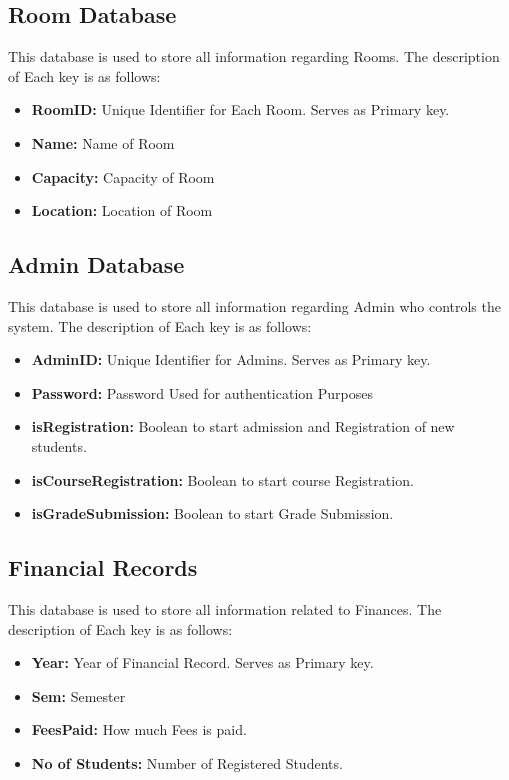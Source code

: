 \documentclass[12pt,a4paper]{article}
\begin{document}
     \subsection{Room Database}
        This database is used to store all information regarding Rooms. The description of Each key is as follows:
        \begin{itemize}
       \item \textbf{RoomID:} Unique Identifier for Each Room. Serves as Primary key.
        \item  \textbf{Name:} Name of Room
        \item  \textbf{Capacity:} Capacity of Room
        \item  \textbf{Location:} Location of Room
    \end{itemize}
    \subsection{Admin Database}
        This database is used to store all information regarding Admin who controls the system. The description of Each key is as follows:
        \begin{itemize}
       \item \textbf{AdminID:} Unique Identifier for Admins. Serves as Primary key.
        \item  \textbf{Password:} Password Used for authentication Purposes
        \item  \textbf{isRegistration:} Boolean to start admission and Registration of new students.
        \item  \textbf{isCourseRegistration:} Boolean to start course Registration.
        \item  \textbf{isGradeSubmission:} Boolean to start Grade Submission.
    \end{itemize}
    \subsection{Financial Records}
        This database is used to store all information related to Finances. The description of Each key is as follows:
        \begin{itemize}
       \item \textbf{Year:} Year of Financial Record. Serves as Primary key.
        \item  \textbf{Sem:} Semester
        \item  \textbf{FeesPaid:} How much Fees is paid.
        \item  \textbf{No of Students:} Number of Registered Students.
    \end{itemize}
\end{document}

